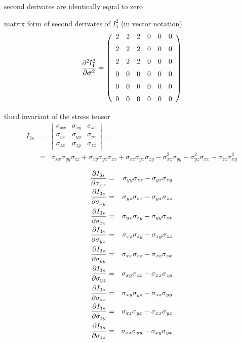 second derivates are identically equal to zero

matrix form of second derivates of $I_1^2$ (in vector notation)
\begin{eqnarray}
\mbox{$\displaystyle\frac{\partial^{2}\>\!\!{I_1^2}}{\partial{\mbox{\boldmath$\sigma$}}^{2}}$} = \left(\begin{array}{rrrrrr}
2 & 2 & 2 & 0 & 0 & 0
\\[2mm]
2 & 2 & 2 & 0 & 0 & 0
\\[2mm]
2 & 2 & 2 & 0 & 0 & 0
\\[2mm]
0 & 0 & 0 & 0 & 0 & 0
\\[2mm]
0 & 0 & 0 & 0 & 0 & 0
\\[2mm]
0 & 0 & 0 & 0 & 0 & 0
\end{array}\right)
\end{eqnarray}

third invariant of the stress tensor
\begin{eqnarray}
I_{3s} &=& \left|\begin{array}{ccc}
\sigma_{xx} & \sigma_{xy} & \sigma_{xz}
\\
\sigma_{yx} & \sigma_{yy} & \sigma_{yz}
\\
\sigma_{zx} & \sigma_{zy} & \sigma_{zz}
\end{array}\right| = 
\\ \nonumber
&=& \sigma_{xx} \sigma_{yy} \sigma_{zz} +  \sigma_{xy} \sigma_{yz} \sigma_{zx} + \sigma_{xz} \sigma_{yx} \sigma_{zy} -  \sigma_{xz}^2 \sigma_{yy} - \sigma_{yz}^2 \sigma_{xx} - \sigma_{zz} \sigma_{xy}^2
\end{eqnarray}


\begin{eqnarray}
\mbox{$\displaystyle\frac{\partial{I_{3s}}}{\partial{\sigma_{xx}}}$} &=& \sigma_{yy}\sigma_{zz} - \sigma_{yz}\sigma_{zy}
\\
\mbox{$\displaystyle\frac{\partial{I_{3s}}}{\partial{\sigma_{xy}}}$} &=& \sigma_{yz}\sigma_{zx} - \sigma_{yx}\sigma_{zz}
\\
\mbox{$\displaystyle\frac{\partial{I_{3s}}}{\partial{\sigma_{xz}}}$} &=& \sigma_{yx}\sigma_{zy} - \sigma_{yy}\sigma_{zx}
\\
\mbox{$\displaystyle\frac{\partial{I_{3s}}}{\partial{\sigma_{yx}}}$} &=& \sigma_{xz}\sigma_{zy} - \sigma_{xy}\sigma_{zz}
\\
\mbox{$\displaystyle\frac{\partial{I_{3s}}}{\partial{\sigma_{yy}}}$} &=& \sigma_{xx}\sigma_{zz} - \sigma_{xz}\sigma_{zx}
\\
\mbox{$\displaystyle\frac{\partial{I_{3s}}}{\partial{\sigma_{yz}}}$} &=& \sigma_{xy}\sigma_{zx} - \sigma_{xx}\sigma_{zy}
\\
\mbox{$\displaystyle\frac{\partial{I_{3s}}}{\partial{\sigma_{zx}}}$} &=& \sigma_{xy}\sigma_{yz} - \sigma_{xz}\sigma_{yy}
\\
\mbox{$\displaystyle\frac{\partial{I_{3s}}}{\partial{\sigma_{zy}}}$} &=& \sigma_{xz}\sigma_{yx} - \sigma_{xx}\sigma_{yz}
\\
\mbox{$\displaystyle\frac{\partial{I_{3s}}}{\partial{\sigma_{zz}}}$} &=& \sigma_{xx}\sigma_{yy} - \sigma_{xy}\sigma_{yx}
\end{eqnarray}

